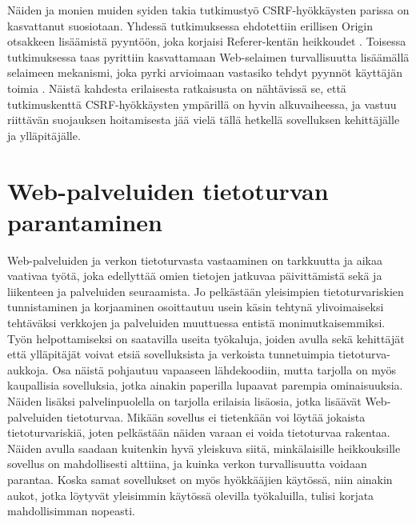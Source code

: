 Näiden ja monien muiden syiden takia tutkimustyö CSRF-hyökkäysten parissa on kasvattanut suosiotaan. Yhdessä tutkimuksessa ehdotettiin erillisen Origin
otsakkeen lisäämistä pyyntöön, joka korjaisi Referer-kentän heikkoudet \cite{CSRF}. Toisessa tutkimuksessa taas pyrittiin kasvattamaan Web-selaimen turvallisuutta
lisäämällä selaimeen mekanismi, joka pyrki arvioimaan vastasiko tehdyt pyynnöt käyttäjän toimia \cite{CSRFb}. Näistä kahdesta erilaisesta ratkaisusta on nähtävissä se,
että tutkimuskenttä CSRF-\-hyökkäysten ympärillä on hyvin alkuvaiheessa, ja vastuu riittävän suojauksen hoitamisesta jää vielä tällä hetkellä 
sovelluksen kehittäjälle ja ylläpitäjälle.

\section{Web-palveluiden tietoturvan parantaminen}

Web-palveluiden ja verkon tietoturvasta vastaaminen on tarkkuutta ja aikaa vaativaa työtä, joka edellyttää omien tietojen jatkuvaa päivittämistä sekä ja liikenteen ja palveluiden
seuraamista. Jo pelkästään yleisimpien tietoturvariskien tunnistaminen ja korjaaminen osoittautuu usein käsin tehtynä ylivoimaiseksi tehtäväksi verkkojen ja palveluiden
muuttuessa entistä monimutkaisemmiksi. Työn helpottamiseksi on saatavilla useita työkaluja, joiden avulla sekä kehittäjät että ylläpitäjät voivat
etsiä sovelluksista ja verkoista tunnetuimpia tietoturva-aukkoja. Osa näistä pohjautuu vapaaseen lähdekoodiin, mutta tarjolla on myös kaupallisia sovelluksia, jotka ainakin 
paperilla lupaavat parempia ominaisuuksia. Näiden lisäksi palvelinpuolella on tarjolla erilaisia lisäosia, jotka lisäävät Web-palveluiden tietoturvaa. 
Mikään sovellus ei tietenkään voi löytää jokaista tietoturvariskiä, joten pelkästään näiden varaan ei voida tietoturvaa rakentaa. Näiden avulla 
saadaan kuitenkin hyvä yleiskuva siitä, minkälaisille heikkouksille sovellus on mahdollisesti alttiina, ja kuinka verkon turvallisuutta voidaan parantaa. Koska samat 
sovellukset on myös hyökkääjien käytössä, niin ainakin aukot, jotka löytyvät yleisimmin käytössä olevilla työkaluilla, tulisi korjata mahdollisimman nopeasti. 

